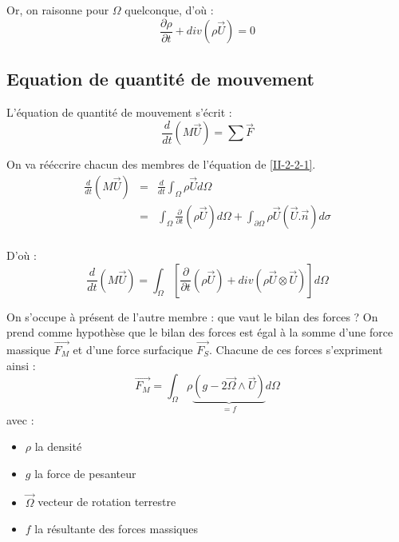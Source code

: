 Or, on raisonne pour $\Omega$ quelconque, d'où :
	\begin{equation} \label{II-2-1-2} \frac{\partial \rho}{\partial t} + div\left(\rho \overrightarrow{U}\right)=0 \end{equation}

	\subsection{Equation de quantité de mouvement}
L'équation de quantité de mouvement s'écrit :
	\begin{equation} \label{II-2-2-1} \frac{d}{dt} \left( M\overrightarrow{U}\right) =\sum \overrightarrow{F} \end{equation}

On va rééccrire chacun des membres de l'équation de \ref{II-2-2-1}. 
\begin{eqnarray*}
	\frac{d}{dt} \left(M\overrightarrow{U}\right) &=& \frac{d}{dt} \int_{\Omega} \rho \overrightarrow{U} d\Omega \\
							&=& \int_{\Omega} \frac{\partial}{\partial t} \left( \rho \overrightarrow{U} \right) d\Omega + \int_{\partial \Omega} \rho \overrightarrow{U}\left(\overrightarrow{U}.\overrightarrow{n}\right) d\sigma \\
\end{eqnarray*}

D'où :
\begin{equation} \frac{d}{dt} \left(M\overrightarrow{U}\right)= \int_{\Omega} \left[ \frac{\partial}{\partial t} \left( \rho \overrightarrow{U} \right) + div\left( \rho \overrightarrow{U}\otimes \overrightarrow{U}\right)\right] d\Omega \label{II-2-2-2} \end{equation}

On s'occupe à présent de l'autre membre : que vaut le bilan des forces ? On prend comme hypothèse que le bilan des forces est égal à la somme d'une force massique $\overrightarrow{F_M}$ et d'une force surfacique $\overrightarrow{F_S}$. Chacune de ces forces s'expriment ainsi :
\begin{equation} \label{II-2-2-3} \overrightarrow{F_M}=\int_{\Omega} \rho\underbrace{\left( g-2\overrightarrow{\Omega}\wedge \overrightarrow{U}\right)}_{=f} d\Omega \end{equation}
avec :
\begin{itemize}
	\item $\rho$ la densité
	\item $g$ la force de pesanteur
	\item $\overrightarrow{\Omega}$ vecteur de rotation terrestre
	\item $f$ la résultante des forces massiques
\end{itemize}

